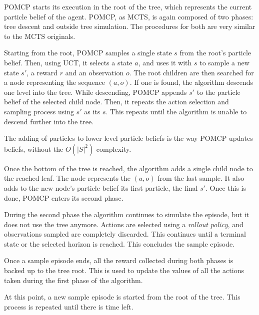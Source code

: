 POMCP starts its execution in the root of the tree, which represents the current particle
belief of the agent. POMCP, as MCTS, is again composed of two phases: tree descent and outside tree
simulation. The procedures for both are very similar to the MCTS originals.

Starting from the root, POMCP samples a single state $s$ from the root's particle belief. Then,
using UCT, it selects a state $a$, and uses it with $s$ to sample a new state $s'$, a reward $r$ and
an observation $o$. The root children are then searched for a node representing the sequence
$(a,o)$. If one is found, the algorithm descends one level into the tree. While descending, POMCP
appends $s'$ to the particle belief of the selected child node. Then, it repeats the action
selection and sampling process using $s'$ as its $s$. This repeats until the algorithm is unable to
descend further into the tree.

The adding of particles to lower level particle beliefs is the way POMCP updates beliefs, without
the $O(|S|^2)$ complexity.

Once the bottom of the tree is reached, the algorithm adds a single child node to the reached leaf.
The node represents the $(a,o)$ from the last sample. It also adds to the new node's particle belief
its first particle, the final $s'$. Once this is done, POMCP enters its second phase.

During the second phase the algorithm continues to simulate the episode, but it does not use the
tree anymore. Actions are selected using a \textit{rollout policy}, and observations sampled are
completely discarded. This continues until a terminal state or the selected horizon is reached. This
concludes the sample episode.

Once a sample episode ends, all the reward collected during both phases is backed up to the tree
root. This is used to update the values of all the actions taken during the first phase of the
algorithm.

At this point, a new sample episode is started from the root of the tree. This process is repeated
until there is time left.

% 
